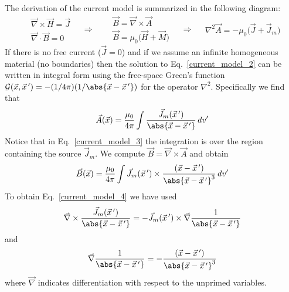 \documentclass[12pt,a4paper,oneside]{book}
\begin{document}
\begin{onehalfspace}
The derivation of the current model is summarized in the following diagram:
\begin{equation*}
	\boxed{\begin{aligned}
			& \vec{\nabla}\times\vec{H} = \vec{J} \\[8pt]
			& \vec{\nabla}\cdot\vec{B} = 0
	\end{aligned}} \quad\Rightarrow\quad
	\boxed{\begin{aligned}
			& \vec{B} = \vec{\nabla}\times\vec{A} \\[8pt]
			& \vec{B} = \mu_0\Big(\vec{H}+\vec{M}\Big) 
	\end{aligned}}\quad\Rightarrow\quad
	\boxed{\begin{aligned}
		\nabla^2\vec{A}=-\mu_0\Big(\vec{J}+\vec{J}_m\Big)
	\end{aligned}}
\end{equation*}
If there is no free current ($\vec{J}=0$) and if we assume an infinite homogeneous material (no boundaries) then  the solution to Eq.~\eqref{current_model_2} can be written in integral form using the free-space Green's function $\mathcal{G}(\vec{x},\vec{x}\,') = -(1/4\pi)(1/\abs{\vec{x}-\vec{x}\,'})$ for the operator $\nabla^2$. Specifically we find that 
 \begin{equation}\label{current_model_3}
 	\begin{aligned}
 		\vec{A}(\vec{x})=\frac{\mu_0}{4\pi}\int\frac{\vec{J}_m(\vec{x}\,')}{\abs{\vec{x}-\vec{x}\,'}}\,dv'
 	\end{aligned}
 \end{equation}
Notice that in Eq.~\eqref{current_model_3} the integration is over the region containing the source $\vec{J}_m$. We compute $\vec{B}=\vec{\nabla}\times\vec{A}$ and obtain 
 \begin{equation}\label{current_model_4}
	\begin{aligned}
		\vec{B}(\vec{x})=\frac{\mu_0}{4\pi}\int\vec{J}_m(\vec{x}\,')\times\frac{(\vec{x}-\vec{x}\,')}{\abs{\vec{x}-\vec{x}\,'}^3}\,dv'
	\end{aligned}
\end{equation}
To obtain Eq.~\eqref{current_model_4} we have used
 \begin{equation*}\label{}
	\begin{aligned}
		\vec{\nabla}\times\frac{\vec{J}_m(\vec{x}\,')}{\abs{\vec{x}-\vec{x}\,'}}=-\vec{J}_m(\vec{x}\,')\times\vec{\nabla}\frac{1}{\abs{\vec{x}-\vec{x}\,'}}
	\end{aligned}
\end{equation*}
and
 \begin{equation*}\label{}
	\begin{aligned}
		\vec{\nabla}\frac{1}{\abs{\vec{x}-\vec{x}\,'}} = -\frac{(\vec{x}-\vec{x}\,')}{\abs{\vec{x}-\vec{x}\,'}^3}
	\end{aligned}
\end{equation*}
where $\vec{\nabla}$ indicates differentiation with respect to the unprimed variables. 


\end{onehalfspace}
\end{document}
